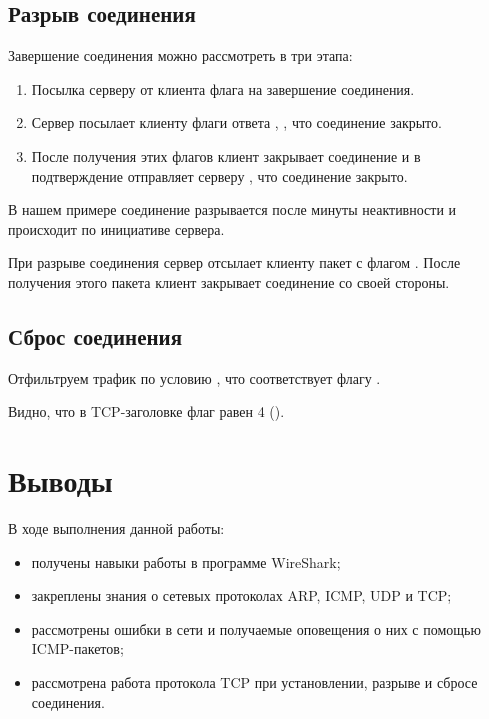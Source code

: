 
\subsection{Разрыв соединения}

Завершение соединения можно рассмотреть в три этапа:

\begin{enumerate}
	\item Посылка серверу от клиента флага  на завершение соединения.
	\item Сервер посылает клиенту флаги ответа , , что соединение закрыто.
	\item После получения этих флагов клиент закрывает соединение и в подтверждение отправляет серверу , что соединение закрыто.
\end{enumerate}

В нашем примере соединение разрывается после минуты неактивности и происходит по инициативе сервера.


При разрыве соединения сервер отсылает клиенту пакет с флагом . После получения этого пакета клиент закрывает соединение со своей стороны.

\subsection{Сброс соединения}

Отфильтруем трафик по условию , что соответствует флагу .


Видно, что в TCP-заголовке флаг равен 4 ().

\section{Выводы}

В ходе выполнения данной работы:
\begin{itemize}
	\item получены навыки работы в программе WireShark;
	\item закреплены знания о сетевых протоколах ARP, ICMP, UDP и TCP;
	\item рассмотрены ошибки в сети и получаемые оповещения о них с помощью ICMP-пакетов;
	\item рассмотрена работа протокола TCP при установлении, разрыве и сбросе соединения.
\end{itemize}

